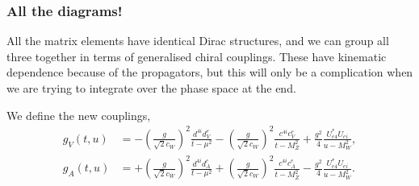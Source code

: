 \documentclass[11pt, a4paper]{article}
\begin{document}
\subsubsection{All the diagrams!}

All the matrix elements have identical Dirac structures, and we can group all
three together in terms of generalised chiral couplings. These have kinematic
dependence because of the propagators, but this will only be a complication
when we are trying to integrate over the phase space at the end.
%

We define the new couplings, 
%
\begin{align*}
%
g_V(t,u) &=  -\left(\frac{g}{\sqrt{2}c_W}\right)^2\frac{d^{4i}d^e_V}{t-\mu^2} -\left(\frac{g}{\sqrt{2}c_W}\right)^2\frac{c^{4i}c^e_V}{t-M_Z^2} +\frac{g^2}{4}\frac{U^*_{e4}U_{ei}}{u-M_W^2},\\ 
%
g_A(t,u) &=  +\left(\frac{g}{\sqrt{2}c_W}\right)^2\frac{d^{4i}d^e_A}{t-\mu^2} +\left(\frac{g}{\sqrt{2}c_W}\right)^2\frac{c^{4i}c^e_A}{t-M_Z^2} -\frac{g^2}{4}\frac{U^*_{e4}U_{ei}}{u-M_W^2}. 
%
\end{align*}
%
\end{document}

